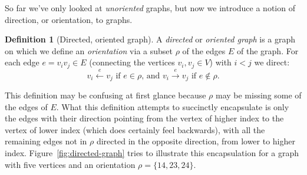 \documentclass{amsart}
\theoremstyle{plain}
\theoremstyle{remark}
\theoremstyle{definition}
\newtheorem*{definition*}{Definition}
\newenvironment{definition}%
	{\begin{leftbar}\begin{definition*}
}{%
	\end{definition*}\end{leftbar}
}
\begin{document}
So far we've only looked at \emph{unoriented} graphs, but
now we introduce a notion of direction, or orientation, to graphs.
\begin{definition}[Directed, oriented graph]
  A \emph{directed} or \emph{oriented graph} is a graph on which we
  define an \emph{orientation} via a subset $\rho$ of the edges $E$ of the
  graph. For each edge $e=v_i v_j\in E$ (connecting the vertices $v_i,v_j\in
  V$) with $i<j$ we direct:
  \[
    v_i\stackrel{e}{\leftarrow}v_j\text{ if }e\in\rho\text{, and }
    v_i\stackrel{e}{\rightarrow}v_j\text{ if }e\notin\rho.
  \]
\end{definition}
This definition may be confusing at first glance because $\rho$
may be missing some of the edges of $E$. What this definition attempts to succinctly
encapsulate is only the edges with their direction pointing from the vertex of higher
index to the vertex of lower index (which does certainly feel backwards),
with all the remaining edges not in $\rho$ directed in the opposite direction,
from lower to higher index.
Figure~\ref{fig:directed-graph} tries to illustrate this encapsulation for a graph
with five vertices and an orientation $\rho=\{14,23,24\}$.
\end{document}
